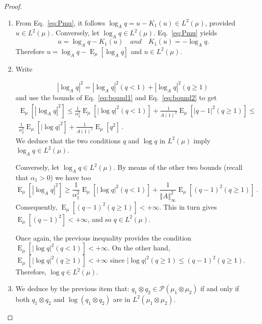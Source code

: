 \documentclass[graybox]{svmult}
\DeclareMathOperator{\Expectation}{E}
\newcommand{\absoluteval}[1]{\left\vert#1\right\vert}
\newcommand{\expectat}[2]{{\Expectation}_{#1}\left[#2\right]}
\begin{document}
\begin{proof}
  \begin{enumerate}
  \item 
From Eq.~\eqref{eq:Pmu}, it follows $\log_A q = u - K_1(u) \in L^2(\mu)$, provided $u\in L^{2}(\mu )$.  Conversely, let $\log _{A}q\in L^{2}(\mu )$. Eq.~\eqref{eq:Pmu} yields
\begin{equation*}
  u = \log_A q - K_1(u) \quad and\quad K_1(u)=- \log_A q.
\end{equation*}
Therefore $u = \log_A q - \expectat \mu {\log_A q}$  and $u\in L^{2}(\mu )$.

\item Write

\begin{equation*}
\absoluteval {\log_A q}^2 = \absoluteval{\log_A q}^2 (q < 1) + \absoluteval{\log_A q}^2 (q \geq 1) \,
\end{equation*}
and use the bounds of Eq.~\eqref{eq:bound1} and Eq.~\eqref{eq:bound2} to get
\begin{multline*}
  \expectat \mu {\absoluteval {\log_A q}^2} \le \frac1{\alpha_2^2}   \expectat \mu{\absoluteval{\log q}^2 (q < 1)} + 
 \frac1{A(1)^2}\expectat \mu {\absoluteval{q-1}^2 (q \geq 1)} \leq \\ \frac1{\alpha_2^2} \expectat \mu {\absoluteval{\log q}^2} + \frac1{A(1)^2} \expectat \mu {q^2} \ .
\end{multline*}
We deduce that the two conditions $q$ and $\log q$ in $L^{2}(\mu )$ imply $\log _{A}q\in L^{2}(\mu )$.  

Conversely, let $\log _{A}q\in L^{2}(\mu )$. By means of the other two bounds (recall that $\alpha_1 > 0$) we have too
\begin{equation*}
  \expectat \mu {\absoluteval {\log_A q}^2} \ge \frac1{\alpha_1^2} \expectat \mu {\absoluteval{\log q}^2(q<1)} + \frac1{\left\Vert A\right\Vert_{\infty}^2}\expectat \mu {(q-1)^2(q \ge 1)}\ .
\end{equation*}
Consequently, $\expectat \mu {(q-1)^2(q \ge 1)} < + \infty$. This in turn gives $\expectat \mu {(q-1)^2} < + \infty$, and so $q \in L^{2}(\mu )$.

Once again, the previous inequality provides the condition $\expectat \mu {\absoluteval{\log q}^2(q<1)} < +\infty$. On the other hand, $\expectat \mu {\absoluteval{\log q}^2(q \ge 1)} < +\infty$ since $\absoluteval{\log q}^2(q \ge 1) \le (q-1)^2 (q \ge 1)$. Therefore, $\log q \in L^{2}(\mu )$.   
\item We deduce by the previous item that: $q_1 \otimes q_2 \in \mathcal P(\mu_1 \otimes \mu_2)$ if and only if both $q_1 \otimes q_2$ and $\log (q_1 \otimes q_2)$ are in $L^2(\mu_1\otimes\mu_2)$.


\end{enumerate}
\end{proof}
\end{document}
